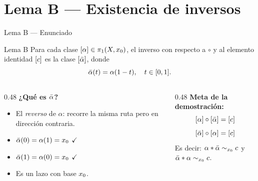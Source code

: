 \section{Lema B — Existencia de inversos}

\begin{frame}{Lema B — Enunciado}
  \begin{block}{Lema B}
    Para cada clase $[\alpha] \in \pi_1(X,x_0)$, el inverso con respecto
    a $\circ$ y al elemento identidad $[c]$ es la clase $[\bar{\alpha}]$,
    donde
    \[
      \bar{\alpha}(t) = \alpha(1-t), \quad t \in [0,1].
    \]
  \end{block}

  \bigskip
  \begin{columns}[T]
    \begin{column}{0.48\textwidth}
      \textbf{¿Qué es $\bar{\alpha}$?}
      \begin{itemize}
        \item El \emph{reverso} de $\alpha$: recorre la misma
              ruta pero en dirección contraria.
        \item $\bar{\alpha}(0) = \alpha(1) = x_0$ \quad $\checkmark$
        \item $\bar{\alpha}(1) = \alpha(0) = x_0$ \quad $\checkmark$
        \item Es un lazo con base $x_0$.
      \end{itemize}
    \end{column}
    \begin{column}{0.48\textwidth}
      \textbf{Meta de la demostración:}
      \[
        [\alpha] \circ [\bar{\alpha}] = [c]
      \]
      \[
        [\bar{\alpha}] \circ [\alpha] = [c]
      \]
      Es decir: $\alpha * \bar{\alpha} \sim_{x_0} c$ \;y\; $\bar{\alpha} * \alpha \sim_{x_0} c$.
    \end{column}
  \end{columns}
\end{frame}

